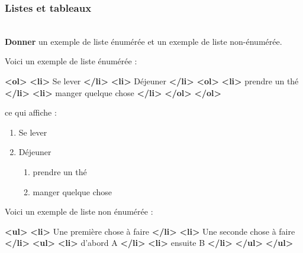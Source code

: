 \documentclass[a4paper,17pt]{extarticle}
\newenvironment{eleve}%
{\begin{activite}\color{noiramu}\\}
{\end{activite}}
\providecommand{\tightlist}{%
      \setlength{\itemsep}{0pt}\setlength{\parskip}{0pt}}
\newenvironment{Shaded}{}{}
\newcommand{\KeywordTok}[1]{\textcolor[rgb]{0.00,0.44,0.13}{\textbf{{#1}}}}
\newcommand{\NormalTok}[1]{{#1}}
\begin{document}
    \hypertarget{listes-et-tableaux}{%
\subsubsection{Listes et tableaux}\label{listes-et-tableaux}}
\begin{eleve}
    \textbf{Donner} un exemple de liste énumérée et un exemple de liste
non-énumérée.
        
        \end{eleve}\begin{reponse}
    Voici un exemple de liste énumérée :

\begin{Shaded}
\begin{Highlighting}[]
\KeywordTok{<ol>}
    \KeywordTok{<li>}\NormalTok{ Se lever }\KeywordTok{</li>}
    \KeywordTok{<li>}\NormalTok{ Déjeuner }\KeywordTok{</li>}
    \KeywordTok{<ol>}
        \KeywordTok{<li>}\NormalTok{ prendre un thé }\KeywordTok{</li>}
        \KeywordTok{<li>}\NormalTok{ manger quelque chose }\KeywordTok{</li>}
    \KeywordTok{</ol>}
\KeywordTok{</ol>}
\end{Highlighting}
\end{Shaded}

ce qui affiche :

\begin{enumerate}
\def\labelenumi{\arabic{enumi}.}
\tightlist
\item
  Se lever
\item
  Déjeuner

  \begin{enumerate}
  \def\labelenumii{\arabic{enumii}.}
  \tightlist
  \item
    prendre un thé
  \item
    manger quelque chose
  \end{enumerate}
\end{enumerate}

Voici un exemple de liste non énumérée :

\begin{Shaded}
\begin{Highlighting}[]
\KeywordTok{<ul>}
    \KeywordTok{<li>}\NormalTok{ Une première chose à faire }\KeywordTok{</li>}
    \KeywordTok{<li>}\NormalTok{ Une seconde chose à faire }\KeywordTok{</li>}
    \KeywordTok{<ul>}
        \KeywordTok{<li>}\NormalTok{ d'abord A }\KeywordTok{</li>}
        \KeywordTok{<li>}\NormalTok{ ensuite B }\KeywordTok{</li>}
    \KeywordTok{</ul>}
\KeywordTok{</ul>}
\end{Highlighting}
\end{Shaded}


\end{reponse}
\end{document}
